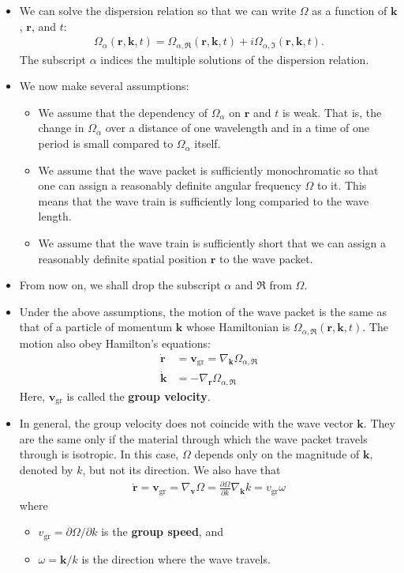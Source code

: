\documentclass[10pt]{article}
\newcommand{\ve}[1]{\mathbf{#1}}
\newcommand{\group}{\mathrm{gr}}
\begin{document}
\begin{itemize}
    \item We can solve the dispersion relation so that we can write $\Omega$ as a function of $\ve{k}$, $\ve{r}$, and $t$:
    \begin{align*}
      \Omega_{\alpha}(\ve{r}, \ve{k}, t) = \Omega_{\alpha,\Re}(\ve{r}, \ve{k}, t) + i \Omega_{\alpha, \Im}(\ve{r}, \ve{k}, t).
    \end{align*}
    The subscript $\alpha$ indices the multiple solutions of the dispersion relation.

    \item We now make several assumptions:
    \begin{itemize}
      \item We assume that the dependency of $\Omega_\alpha$ on $\ve{r}$ and $t$ is weak. That is, the change in $\Omega_\alpha$ over a distance of one wavelength and in a time of one period is small compared to $\Omega_\alpha$ itself.
      \item We assume that the wave packet is sufficiently monochromatic so that one can assign a reasonably definite angular frequency $\Omega$ to it. This means that the wave train is sufficiently long comparied to the wave length.
      \item We assume that the wave train is sufficiently short that we can assign a reasonably definite spatial position $\ve{r}$ to the wave packet.
    \end{itemize}

    \item From now on, we shall drop the subscript $\alpha$ and $\Re$ from $\Omega$.

    \item Under the above assumptions, the motion of the wave packet is the same as that of a particle of momentum $\ve{k}$ whose Hamiltonian is $\Omega_{\alpha, \Re}(\ve{r}, \ve{k}, t)$. The motion also obey Hamilton's equations:
    \begin{align*}
      \dot{\ve{r}} &= \ve{v}_{\group} = \nabla_{\ve{k}} \Omega_{\alpha, \Re}\\
      \dot{\ve{k}} &= -\nabla_{\ve{r}} \Omega_{\alpha, \Re}
    \end{align*}
    Here, $\ve{v}_\group$ is called the \textbf{group velocity}.

    \item In general, the group velocity does not coincide with the wave vector $\ve{k}$. They are the same only if the material through which the wave packet travels through is isotropic. In this case, $\Omega$ depends only on the magnitude of $\ve{k}$, denoted by $k$, but not its direction. We also have that
    \begin{align*}
      \dot{\ve{r}} = \ve{v}_\group = \nabla_{\ve{v}} \Omega = \frac{\partial \Omega}{\partial k} \nabla_{\ve{k}} k = v_\group \omega
    \end{align*}
    where 
    \begin{itemize}
      \item $v_\group = \partial \Omega / \partial k$ is the \textbf{group speed}, and
      \item $\omega = \ve{k} / k$ is the direction where the wave travels.
    \end{itemize}


\end{itemize}
\end{document}
